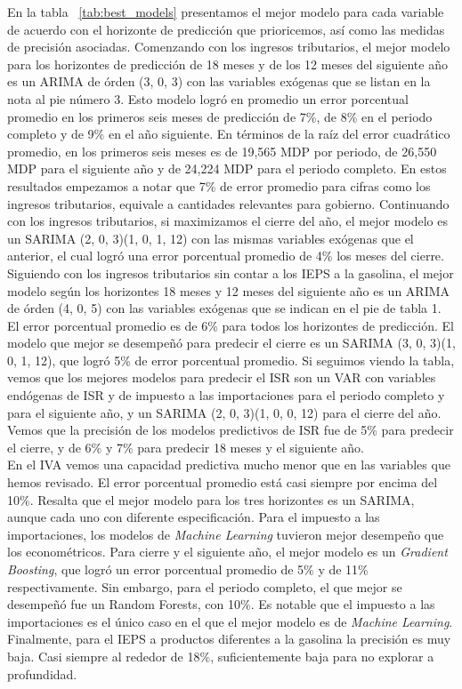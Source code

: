 \documentclass[a4paper, 11pt]{article}
\begin{document}
En la tabla ~\ref{tab:best_models} presentamos el mejor modelo para cada variable de acuerdo con el horizonte de predicción que prioricemos, así como las medidas de precisión asociadas. Comenzando con los ingresos tributarios, el mejor modelo para los horizontes de predicción de 18 meses y de los 12 meses del siguiente año es un ARIMA de órden (3, 0, 3) con las variables  exógenas que se listan en la nota al pie número 3. Esto modelo logró en promedio un error porcentual promedio en los primeros seis meses de predicción de 7\%, de 8\% en el periodo completo y de 9\% en el año siguiente. En términos de la raíz del error cuadrático promedio, en los primeros seis meses es de 19,565 MDP por periodo, de 26,550 MDP para el siguiente año y de 24,224 MDP para el periodo completo. En estos resultados empezamos a notar que 7\% de error promedio para cifras como los ingresos tributarios, equivale a cantidades relevantes para gobierno. Continuando con los ingresos tributarios, si maximizamos el cierre del año, el mejor modelo es un SARIMA (2, 0, 3)(1, 0, 1, 12) con las mismas variables exógenas que el anterior, el cual logró una error porcentual promedio de 4\% los meses del cierre.\\

Siguiendo con los ingresos tributarios sin contar a los IEPS a la gasolina, el mejor modelo según los horizontes 18 meses y 12 meses del siguiente año es un ARIMA de órden (4, 0, 5) con las variables exógenas que se indican en el pie de tabla 1. El error porcentual promedio es de 6\% para todos los horizontes de predicción. El modelo que mejor se desempeñó para predecir el cierre es un SARIMA (3, 0, 3)(1, 0, 1, 12), que logró 5\% de error porcentual promedio.  Si seguimos viendo la tabla, vemos que los mejores modelos para predecir el ISR son un VAR con variables endógenas de ISR y de impuesto a las importaciones para el periodo completo y para el siguiente año, y un SARIMA (2, 0, 3)(1, 0, 0, 12) para el cierre del año. Vemos que la precisión de los modelos predictivos de ISR fue de 5\% para predecir el cierre, y de 6\% y 7\% para predecir 18 meses y el siguiente año.\\

En el IVA vemos una capacidad predictiva mucho menor que en las variables que hemos revisado. El error porcentual promedio está casi siempre por encima del 10\%. Resalta que el mejor modelo para los tres horizontes es un SARIMA, aunque cada uno con diferente especificación. Para el impuesto a las importaciones, los modelos de \textit{Machine Learning} tuvieron mejor desempeño que los econométricos. Para cierre y el siguiente año, el mejor modelo es un \textit{Gradient Boosting}, que logró un error porcentual promedio de 5\% y de 11\% respectivamente. Sin embargo, para el periodo completo, el que mejor se desempeñó fue un Random Forests, con 10\%. Es notable que el impuesto a las importaciones es el único caso en el que el mejor modelo es de \textit{Machine Learning}. Finalmente, para el IEPS a productos diferentes a la gasolina la precisión es muy baja. Casi siempre al rededor de 18\%, suficientemente baja para no explorar a profundidad.\\
\end{document}
